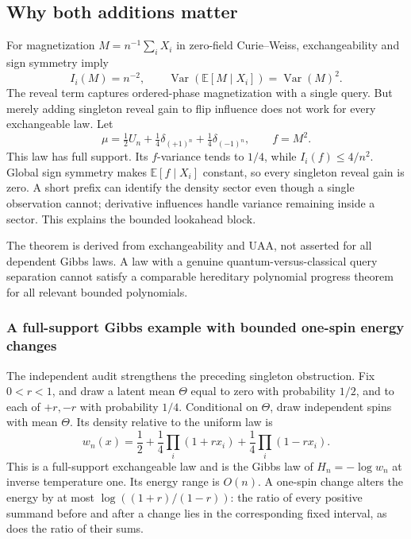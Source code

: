 \subsection{Why both additions matter}\label{influence-recovery:why-both-additions-matter}

For magnetization \(M=n^{-1}\sum_iX_i\) in zero-field Curie--Weiss,
exchangeability and sign symmetry imply \[
 I_i(M)=n^{-2},\qquad
 \operatorname{Var}(\mathbb E[M\mid X_i])
   =\operatorname{Var}(M)^2.
\] The reveal term captures ordered-phase magnetization with a single
query. But merely adding singleton reveal gain to flip influence does
not work for every exchangeable law. Let \[
 \mu=\tfrac12U_n+\tfrac14\delta_{(+1)^n}
                       +\tfrac14\delta_{(-1)^n},\qquad f=M^2.
\] This law has full support. Its \(f\)-variance tends to \(1/4\), while
\(I_i(f)\le4/n^2\). Global sign symmetry makes \(\mathbb E[f\mid X_i]\)
constant, so every singleton reveal gain is zero. A short prefix can
identify the density sector even though a single observation cannot;
derivative influences handle variance remaining inside a sector. This
explains the bounded lookahead block.

The theorem is derived from exchangeability and UAA, not asserted for
all dependent Gibbs laws. A law with a genuine quantum-versus-classical
query separation cannot satisfy a comparable hereditary polynomial
progress theorem for all relevant bounded polynomials.

\subsubsection{A full-support Gibbs example with bounded one-spin energy changes}
\label{influence-recovery:smooth-singleton-obstruction}

The independent audit strengthens the preceding singleton obstruction.
Fix \(0<r<1\), and draw a latent mean \(\Theta\) equal to zero with
probability \(1/2\), and to each of \(+r,-r\) with probability \(1/4\).
Conditional on \(\Theta\), draw independent spins with mean \(\Theta\).
Its density relative to the uniform law is
\[
 w_n(x)=\frac12+\frac14\prod_i(1+rx_i)
                    +\frac14\prod_i(1-rx_i).
\]
This is a full-support exchangeable law and is the Gibbs law of
\(H_n=-\log w_n\) at inverse temperature one. Its energy range is \(O(n)\).
A one-spin change alters the energy by at most
\(\log((1+r)/(1-r))\): the ratio of every positive summand before and
after a change lies in the corresponding fixed interval, as does the
ratio of their sums.

